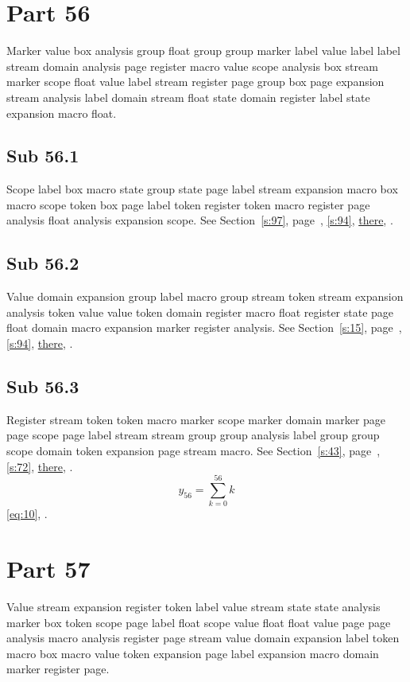 \documentclass[11pt]{article}
\begin{document}
\section{Part 56}\label{s:56}
Marker value box analysis group float group group marker label value label label stream domain analysis page register macro value scope analysis box stream marker scope float value label stream register page group box page expansion stream analysis label domain stream float state domain register label state expansion macro float.
\subsection{Sub 56.1}\label{ss:56.1} Scope label box macro state group state page label stream expansion macro box macro scope token box page label token register token macro register page analysis float analysis expansion scope. See Section~\ref{s:97}, page~\pageref{ss:85.3}, \cref{s:94}, \hyperref[s:85]{there}, \cite{k63,k53}.
\subsection{Sub 56.2}\label{ss:56.2} Value domain expansion group label macro group stream token stream expansion analysis token value value token domain register macro float register state page float domain macro expansion marker register analysis. See Section~\ref{s:15}, page~\pageref{ss:95.2}, \cref{s:94}, \hyperref[s:96]{there}, \cite{k101,k72}.
\subsection{Sub 56.3}\label{ss:56.3} Register stream token token macro marker scope marker domain marker page page scope page label stream stream group group analysis label group group scope domain token expansion page stream macro. See Section~\ref{s:43}, page~\pageref{ss:95.1}, \cref{s:72}, \hyperref[s:39]{there}, \cite{k98,k83}.
\begin{equation}y_{56}=\sum_{k=0}^{56}k\label{eq:56}\end{equation} \eqref{eq:10}, .
\section{Part 57}\label{s:57}
Value stream expansion register token label value stream state state analysis marker box token scope page label float scope value float float value page page analysis macro analysis register page stream value domain expansion label token macro box macro value token expansion page label expansion macro domain marker register page.
\end{document}
